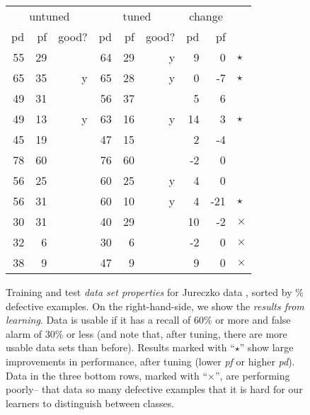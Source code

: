 \begin{figure*}[hbtp!]
\begin{center}
\begin{minipage}{.4\linewidth}
\begin{tabular}{|rrr|rrr|rr|l}
				\multicolumn{3}{|c|}{untuned} & \multicolumn{3}{c|}{tuned} & \multicolumn{2}{c|}{change}\\
				\cline{1-8}
				
				pd & pf & good? & pd & pf & good? & pd & pf\\\cline{1-8}
				\rowcolor{celadon}55 & 29 &   & 64 & 29 & y & 9 & 0&$\star$\\
				\rowcolor{celadon}	65 & 35 & y & 65 & 28 & y & 0 & -7&$\star$\\
				49 & 31 &   & 56 & 37 &   & 5 & 6\\
				\rowcolor{celadon}	49 & 13 & y & 63 & 16 & y & 14 & 3&$\star$\\
				45 & 19 &   & 47 & 15 &   & 2 & -4\\
				78 & 60 &   & 76 & 60 &   & -2 & 0\\
				56 & 25 &   & 60 & 25 & y & 4 & 0\\
				\rowcolor{celadon}	56 & 31 &   & 60 & 10 & y & 4 & -21&$\star$\\
			\rowcolor{lavenderpink}	30 & 31 &   & 40 & 29 &   & 10 & -2&$\times$\\
				\rowcolor{lavenderpink}32 & 6 &   & 30 & 6 &   & -2 & 0&$\times$\\
				\rowcolor{lavenderpink}38 & 9 &   & 47 & 9 &   & 9 & 0&$\times$\\
				\hline 
			\end{tabular}
			
		\end{minipage}
	\end{center}    
	
	\caption{Training and test {\em data set properties} for  Jureczko data ,
		sorted by \% defective examples.
		On the right-hand-side, we show the {\em results from learning}.
		Data is usable if it has a recall of 60\% or more and false alarm of 30\% or less (and note that, after tuning, there are more usable data sets than before). Results  	\colorbox{celadon}{ marked with ``$\star$''} show large improvements in performance, after tuning
		(lower {\em pf} or higher {\em pd}).
		Data in  the  \colorbox{lavenderpink}{three bottom rows}, marked with ``$\times$'', are  performing
		poorly-- that data so many defective examples  that it  is hard for
		our learners to distinguish between classes.
	}\label{fig:j}
\end{figure*}
